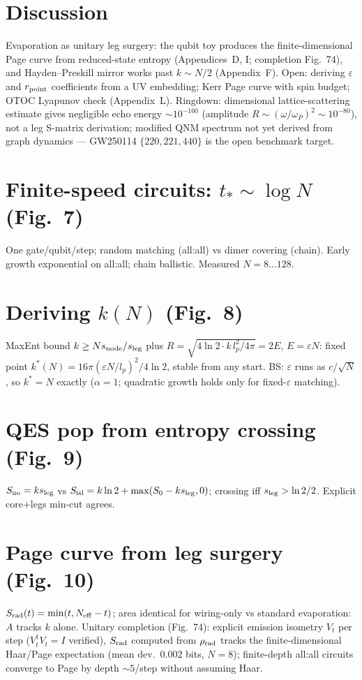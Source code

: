\documentclass[11pt]{article}
\begin{document}
\section{Discussion}
Evaporation as unitary leg surgery: the qubit toy produces the
finite-dimensional Page curve from reduced-state entropy (Appendices~D, I;
completion Fig.~74), and Hayden--Preskill mirror works past $k\sim N/2$
(Appendix~F). Open: deriving
$\varepsilon$ and $r_{\rm point}$ coefficients from a UV embedding; Kerr
Page curve with spin budget; OTOC Lyapunov check (Appendix~L).
Ringdown: dimensional lattice-scattering estimate gives negligible echo energy
$\sim10^{-160}$ (amplitude $R\sim(\omega/\omega_P)^2\sim10^{-80}$), not a leg
S-matrix derivation; modified QNM spectrum not yet derived from graph dynamics
--- GW250114 $\{220,221,440\}$ is the open benchmark target.

\appendix
\setcounter{section}{0}
\renewcommand{\thesection}{A\arabic{section}}
\section{Finite-speed circuits: $t_*\sim\log N$ (Fig.~7)}
One gate/qubit/step; random matching (all:all) vs dimer covering (chain).
Early growth exponential on all:all; chain ballistic. Measured $N=8\ldots128$.

\section{Deriving $k(N)$ (Fig.~8)}
MaxEnt bound $k\ge Ns_{\rm node}/s_{\rm leg}$ plus $R=\sqrt{4\ln2\cdot k\,l_p^2/4\pi}=2E$,
$E=\varepsilon N$: fixed point $k^*(N)=16\pi(\varepsilon N/l_p)^2/4\ln2$, stable
from any start. BS: $\varepsilon$ runs as $c/\sqrt N$, so $k^*=N$ exactly
($\alpha=1$; quadratic growth holds only for fixed-$\varepsilon$ matching).

\section{QES pop from entropy crossing (Fig.~9)}
$S_{\rm no}=ks_{\rm leg}$ vs $S_{\rm isl}=k\ln2+\max(S_0-ks_{\rm leg},0)$;
crossing iff $s_{\rm leg}>\ln2/2$. Explicit core+legs min-cut agrees.

\section{Page curve from leg surgery (Fig.~10)}
$S_{\rm rad}(t)=\min(t,N_{\rm eff}-t)$; area identical for wiring-only vs
standard evaporation: $A$ tracks $k$ alone. Unitary completion (Fig.~74):
explicit emission isometry $V_t$ per step ($V_t^\dagger V_t=I$ verified),
$S_{\rm rad}$ computed from $\rho_{\rm rad}$ tracks the finite-dimensional
Haar/Page expectation (mean dev.\ $0.002$ bits, $N=8$); finite-depth all:all
circuits converge to Page by
depth $\sim5$/step without assuming Haar.
\end{document}
